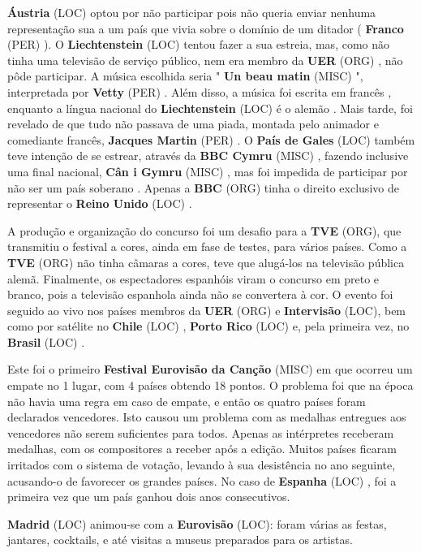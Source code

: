 \documentclass[12pt,a4paper]{article}
\begin{document}
\textbf{Áustria} (LOC) optou por não participar pois não queria enviar nenhuma representação sua a um país que vivia sobre o domínio de um ditador ( \textbf{Franco} (PER) ). O \textbf{Liechtenstein} (LOC) tentou fazer a sua estreia, mas, como não tinha uma televisão de serviço público, nem era membro da \textbf{UER} (ORG) , não pôde participar. A música escolhida seria " \textbf{Un beau matin} (MISC) ", interpretada por \textbf{Vetty} (PER) . Além disso, a música foi escrita em francês , enquanto a língua nacional do \textbf{Liechtenstein} (LOC) é o alemão . Mais tarde, foi revelado de que tudo não passava de uma piada, montada pelo animador e comediante francês, \textbf{Jacques Martin} (PER) . O \textbf{País de Gales} (LOC) também teve intenção de se estrear, através da \textbf{BBC Cymru} (MISC) , fazendo inclusive uma final nacional, \textbf{Cân i Gymru} (MISC) , mas foi impedida de participar por não ser um país soberano . Apenas a \textbf{BBC} (ORG) tinha o direito exclusivo de representar o \textbf{Reino Unido} (LOC) .

A produção e organização do concurso foi um desafio para a \textbf{TVE} (ORG), que transmitiu o festival a cores, ainda em fase de testes, para vários países. Como a \textbf{TVE} (ORG) não tinha câmaras a cores, teve que alugá-los na televisão pública alemã. Finalmente, os espectadores espanhóis viram o concurso em preto e branco, pois a televisão espanhola ainda não se convertera à cor. O evento foi seguido ao vivo nos países membros da \textbf{UER} (ORG) e \textbf{Intervisão} (LOC), bem como por satélite no \textbf{Chile} (LOC) , \textbf{Porto Rico} (LOC) e, pela primeira vez, no \textbf{Brasil} (LOC) .

Este foi o primeiro \textbf{Festival Eurovisão da Canção} (MISC) em que ocorreu um empate no 1 lugar, com 4 países obtendo 18 pontos. O problema foi que na época não havia uma regra em caso de empate, e então os quatro países foram declarados vencedores. Isto causou um problema com as medalhas entregues aos vencedores não serem suficientes para todos. Apenas as intérpretes receberam medalhas, com os compositores a receber após a edição. Muitos países ficaram irritados com o sistema de votação, levando à sua desistência no ano seguinte, acusando-o de favorecer os grandes países. No caso de \textbf{Espanha} (LOC) , foi a primeira vez que um país ganhou dois anos consecutivos.

\textbf{Madrid} (LOC) animou-se com a \textbf{Eurovisão} (LOC): foram várias as festas, jantares, cocktails, e até visitas a museus preparados para os artistas.
\end{document}
